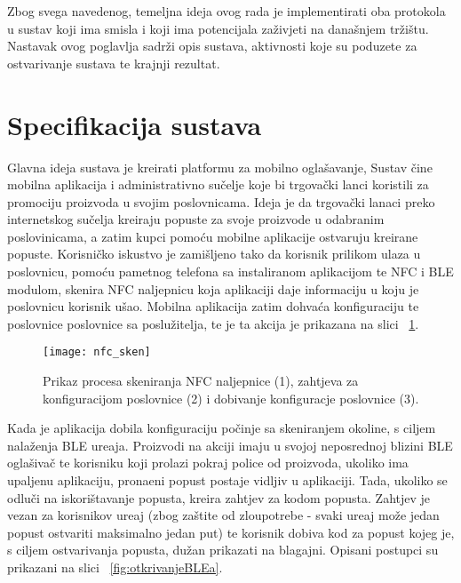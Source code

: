 Zbog svega navedenog, temeljna ideja ovog rada je implementirati oba protokola u sustav koji ima smisla i koji ima potencijala za\v{z}ivjeti na dana\v{s}njem tr\v{z}i\v{s}tu. Nastavak ovog poglavlja sadr\v{z}i opis sustava, aktivnosti koje su poduzete za ostvarivanje sustava te krajnji rezultat.

\section{Specifikacija sustava}

Glavna ideja sustava je kreirati platformu za mobilno ogla\v{s}avanje, Sustav \v{c}ine mobilna aplikacija i administrativno su\v{c}elje koje bi trgova\v{c}ki lanci koristili za promociju proizvoda u svojim poslovnicama. Ideja je da trgova\v{c}ki lanaci preko internetskog su\v{c}elja kreiraju popuste za svoje proizvode u odabranim poslovinicama, a zatim kupci pomo\'{c}u mobilne aplikacije ostvaruju kreirane popuste. Korisni\v{c}ko iskustvo je zami\v{s}ljeno tako da korisnik prilikom ulaza u poslovnicu, pomo\'{c}u pametnog telefona sa instaliranom aplikacijom te NFC i BLE modulom, skenira NFC naljepnicu koja aplikaciji daje informaciju u koju je poslovnicu korisnik u\v{s}ao. Mobilna aplikacija zatim dohva\'{c}a konfiguraciju te poslovnice poslovnice sa poslu\v{z}itelja, te je ta akcija je prikazana na slici ~\ref{fig:skeniranjeNaljepnice}.

\begin{figure}[!htbp]
	\begin{center}
 \texttt{[image: nfc\_sken]}
 \caption{Prikaz procesa skeniranja NFC naljepnice (1), zahtjeva za konfiguracijom poslovnice (2) i dobivanje konfiguracje poslovnice (3).}
 \label{fig:skeniranjeNaljepnice}
	\end{center}
\end{figure}

Kada je aplikacija dobila konfiguraciju po\v{c}inje sa skeniranjem okoline, s ciljem nala\v{z}enja BLE ure\dj aja. Proizvodi na akciji imaju u svojoj neposrednoj blizini BLE ogla\v{s}iva\v{c} te korisniku koji prolazi pokraj police od proizvoda, ukoliko ima upaljenu aplikaciju, prona\dj eni popust postaje vidljiv u aplikaciji. Tada, ukoliko se odlu\v{c}i na iskori\v{s}tavanje popusta, kreira zahtjev za kodom popusta. Zahtjev je vezan za korisnikov ure\dj aj (zbog za\v{s}tite od zloupotrebe - svaki ure\dj aj mo\v{z}e jedan popust ostvariti maksimalno jedan put) te korisnik dobiva kod za popust kojeg je, s ciljem ostvarivanja popusta, du\v{z}an prikazati na blagajni. Opisani postupci su prikazani na slici  ~\ref{fig:otkrivanjeBLEa}.

